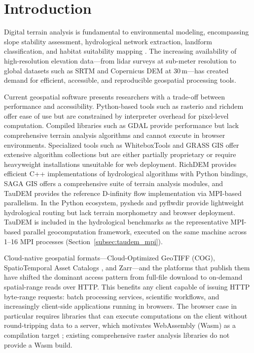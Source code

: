 \documentclass[preprint,review,12pt,authoryear]{elsarticle}
\newif\ifmarkedrev
\newcommand{\revtext}[1]{\ifmarkedrev\textcolor{blue}{#1}\else#1\fi}
\begin{document}
\linenumbers

\section{Introduction}
\label{sec:introduction}

Digital terrain analysis is fundamental to environmental modeling, encompassing slope stability assessment, hydrological network extraction, landform classification, and habitat suitability mapping \citep{florinsky2025}. The increasing availability of high-resolution elevation data---from lidar surveys at sub-meter resolution to global datasets such as SRTM \citep{farr2007srtm} and Copernicus DEM at 30\,m---has created demand for efficient, accessible, and reproducible geospatial processing tools.

Current geospatial software presents researchers with a trade-off between performance and accessibility. Python-based tools such as rasterio and richdem offer ease of use but are constrained by interpreter overhead for pixel-level computation. Compiled libraries such as GDAL \citep{gdal2024} provide performance but lack comprehensive terrain analysis algorithms and cannot execute in browser environments. Specialized tools such as WhiteboxTools \citep{lindsay2016wbt} and GRASS GIS \citep{neteler2012} offer extensive algorithm collections but are either partially proprietary or require heavyweight installations unsuitable for web deployment. RichDEM \citep{barnes2016richdem} provides efficient C++ implementations of hydrological algorithms with Python bindings, SAGA GIS \citep{conrad2015} offers a comprehensive suite of terrain analysis modules, and TauDEM \citep{tarboton2015taudem} provides the reference D-infinity flow implementation \citep{tarboton1997} via MPI-based parallelism. In the Python ecosystem, pysheds \citep{bartos2020pysheds} and pyflwdir \citep{eilander2021pyflwdir} provide lightweight hydrological routing but lack terrain morphometry and browser deployment. \revtext{TauDEM is included in the hydrological benchmarks as the representative MPI-based parallel geocomputation framework, executed on the same machine across 1--16 MPI processes (Section~\ref{subsec:taudem_mpi}).}

Cloud-native geospatial formats---Cloud-Optimized GeoTIFF (COG), SpatioTemporal Asset Catalogs \citep[STAC;][]{stac2021}, and Zarr---and the platforms that publish them \citep{gorelick2017gee} have shifted the dominant access pattern from full-file download to on-demand spatial-range reads over HTTP. This benefits any client capable of issuing HTTP byte-range requests: batch processing services, scientific workflows, and increasingly client-side applications running in browsers. The browser case in particular requires libraries that can execute computations on the client without round-tripping data to a server, which motivates WebAssembly (Wasm) as a compilation target \citep{haas2017}; existing comprehensive raster analysis libraries do not provide a Wasm build.
\end{document}
